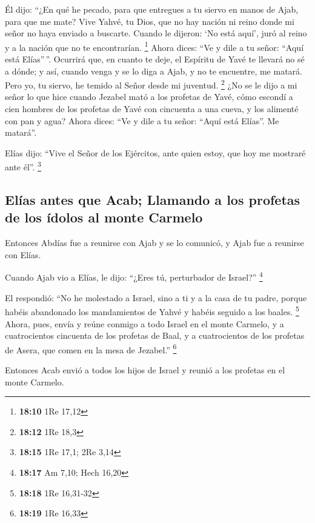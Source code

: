 \begin{paracol}{2}
 Él dijo: ``¿En qué he pecado, para que entregues a tu
siervo en manos de Ajab, para que me mate?  Vive Yahvé,
tu Dios, que no hay nación ni reino donde mi señor no haya enviado a
buscarte. Cuando le dijeron: `No está aquí', juró al reino y a la nación
que no te encontrarían. \footnote{\textbf{18:10} 1Re 17,12}
 Ahora dices: ``Ve y dile a tu señor: ``Aquí está
Elías''\,''.  Ocurrirá que, en cuanto te deje, el
Espíritu de Yavé te llevará no sé a dónde; y así, cuando venga y se lo
diga a Ajab, y no te encuentre, me matará. Pero yo, tu siervo, he temido
al Señor desde mi juventud. \footnote{\textbf{18:12} 1Re 18,3}
 ¿No se le dijo a mi señor lo que hice cuando Jezabel
mató a los profetas de Yavé, cómo escondí a cien hombres de los profetas
de Yavé con cincuenta a una cueva, y los alimenté con pan y agua?
 Ahora dices: ``Ve y dile a tu señor: ``Aquí está
Elías''. Me matará''.

 Elías dijo: ``Vive el Señor de los Ejércitos, ante quien
estoy, que hoy me mostraré ante él''. \footnote{\textbf{18:15} 1Re 17,1;
  2Re 3,14}

\hypertarget{eluxedas-antes-que-acab-llamando-a-los-profetas-de-los-uxeddolos-al-monte-carmelo}{%
\subsection{Elías antes que Acab; Llamando a los profetas de los ídolos
al monte
Carmelo}\label{eluxedas-antes-que-acab-llamando-a-los-profetas-de-los-uxeddolos-al-monte-carmelo}}

 Entonces Abdías fue a reunirse con Ajab y se lo
comunicó, y Ajab fue a reunirse con Elías.

 Cuando Ajab vio a Elías, le dijo: ``¿Eres tú,
perturbador de Israel?'' \footnote{\textbf{18:17} Am 7,10; Hech 16,20}

 El respondió: ``No he molestado a Israel, sino a ti y a
la casa de tu padre, porque habéis abandonado los mandamientos de Yahvé
y habéis seguido a los baales. \footnote{\textbf{18:18} 1Re 16,31-32}
 Ahora, pues, envía y reúne conmigo a todo Israel en el
monte Carmelo, y a cuatrocientos cincuenta de los profetas de Baal, y a
cuatrocientos de los profetas de Asera, que comen en la mesa de
Jezabel.'' \footnote{\textbf{18:19} 1Re 16,33}

 Entonces Acab envió a todos los hijos de Israel y reunió
a los profetas en el monte Carmelo.


\end{paracol}
